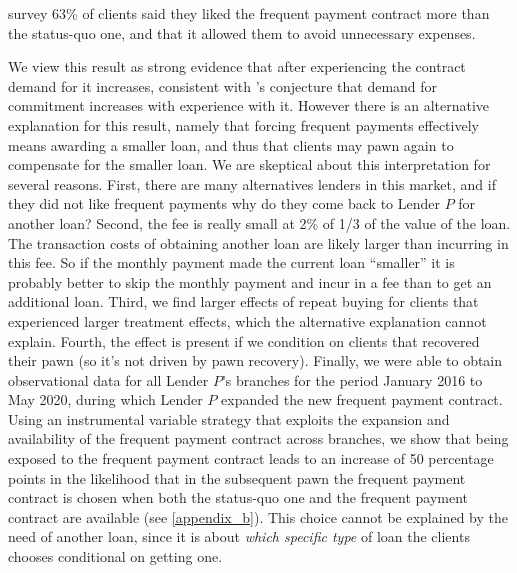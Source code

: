 \documentclass[oneside,11pt]{article}
\begin{document}
survey 63\% of clients said they liked the frequent payment contract more than the status-quo one, and that it allowed them to avoid unnecessary expenses. %

We view this result as strong evidence that after experiencing the contract demand for it increases, consistent with \cite{Alcohol}'s conjecture that demand for commitment increases with experience with it. However there is an alternative explanation for this result, namely that forcing frequent payments effectively means awarding a smaller loan, and thus that clients may pawn again to compensate for the smaller loan. We are skeptical about this interpretation for several reasons. %
First,  there are many alternatives lenders in this market, and if they did not like frequent payments why do they come back to Lender $P$ for another loan? Second, the fee is really small at 2\% of 1/3 of the value of the loan. The transaction costs of obtaining another loan are likely larger than incurring in this fee. So if the monthly payment made the current loan ``smaller'' it is probably better to skip the monthly payment and incur in a fee than to get an additional loan. Third, we find larger effects of repeat buying for clients that experienced larger treatment effects, which the alternative explanation cannot explain. Fourth, the effect is present if we condition on clients that recovered their pawn (so it's not driven by pawn recovery). Finally, we were able to obtain observational data for all Lender $P$'s branches for the period January 2016 to May 2020, during which Lender $P$ expanded the new frequent payment contract. Using an instrumental variable strategy that exploits the expansion and availability of the frequent payment contract across branches, we show that being exposed to the frequent payment contract leads to an increase of 50 percentage points in the likelihood that in the subsequent pawn the frequent payment contract is chosen when both the status-quo one and the frequent payment contract are available (see \ref{appendix_b}). This choice cannot be explained by the need of another loan, since it is about \textit{which specific type} of loan the clients chooses conditional on getting one.
\end{document}
